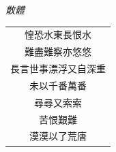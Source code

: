 \documentclass{ctexart}
\begin{document}
	\begin{titlepage}
		\thispagestyle{empty}
		
		\begingroup
		\setlength{\parindent}{0pt}
		\setlength{\parskip}{0pt}
		
		\vspace{3.0cm} 
		
		\begin{center}
			{\large \itshape 散體}
			\vspace{0.3cm}
			
			\begin{minipage}{\linewidth}
				\centering
				{\large \itshape
					\begin{tabular}{@{}c@{}}
					惶恐水東長恨水\\
					難盡難察亦悠悠\\
					長言世事漂浮又自深重\\
					未以千番萬番\\
					尋尋又索索\\
					苦恨艱難\\
					漠漠以了荒唐\\
					\end{tabular}
				}
			\end{minipage}
			
		\end{center}
		
		\endgroup
	\end{titlepage}
	
\end{document}
